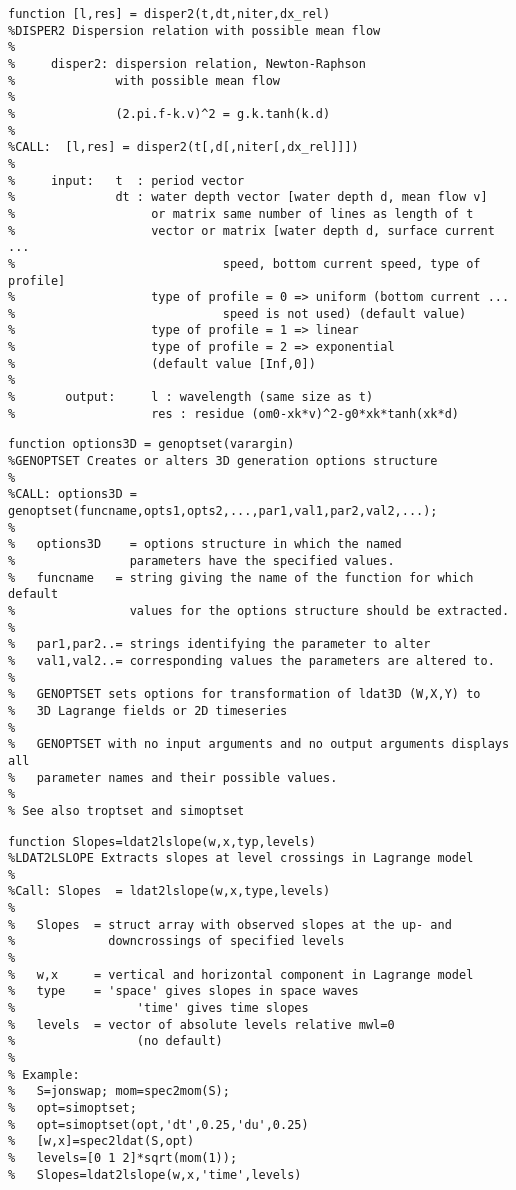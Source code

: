 {\begin{verbatim}
function [l,res] = disper2(t,dt,niter,dx_rel)
%DISPER2 Dispersion relation with possible mean flow
%
%     disper2: dispersion relation, Newton-Raphson
%              with possible mean flow
%
%              (2.pi.f-k.v)^2 = g.k.tanh(k.d)
%
%CALL:  [l,res] = disper2(t[,d[,niter[,dx_rel]]])
%
%     input:   t  : period vector
%              dt : water depth vector [water depth d, mean flow v] 
%                   or matrix same number of lines as length of t
%                   vector or matrix [water depth d, surface current ...
%                             speed, bottom current speed, type of profile]
%                   type of profile = 0 => uniform (bottom current ... 
%                             speed is not used) (default value)
%                   type of profile = 1 => linear
%                   type of profile = 2 => exponential
%                   (default value [Inf,0])
%
%       output:     l : wavelength (same size as t)
%                   res : residue (om0-xk*v)^2-g0*xk*tanh(xk*d)
\end{verbatim}
\clearpage

\begin{verbatim}
function options3D = genoptset(varargin)
%GENOPTSET Creates or alters 3D generation options structure
%
%CALL: options3D = genoptset(funcname,opts1,opts2,...,par1,val1,par2,val2,...);
%
%   options3D    = options structure in which the named 
%                parameters have the specified values.  
%   funcname   = string giving the name of the function for which default
%                values for the options structure should be extracted.
%
%   par1,par2..= strings identifying the parameter to alter
%   val1,val2..= corresponding values the parameters are altered to.
%   
%   GENOPTSET sets options for transformation of ldat3D (W,X,Y) to 
%   3D Lagrange fields or 2D timeseries
%
%   GENOPTSET with no input arguments and no output arguments displays all 
%   parameter names and their possible values.
%
% See also troptset and simoptset
\end{verbatim}
\clearpage

\begin{verbatim}
function Slopes=ldat2lslope(w,x,typ,levels)
%LDAT2LSLOPE Extracts slopes at level crossings in Lagrange model
%
%Call: Slopes  = ldat2lslope(w,x,type,levels)
%               
%   Slopes  = struct array with observed slopes at the up- and 
%             downcrossings of specified levels
%
%   w,x     = vertical and horizontal component in Lagrange model
%   type    = 'space' gives slopes in space waves
%                 'time' gives time slopes
%   levels  = vector of absolute levels relative mwl=0 
%                 (no default)
%
% Example:
%   S=jonswap; mom=spec2mom(S);
%   opt=simoptset;
%   opt=simoptset(opt,'dt',0.25,'du',0.25)
%   [w,x]=spec2ldat(S,opt)
%   levels=[0 1 2]*sqrt(mom(1));
%   Slopes=ldat2lslope(w,x,'time',levels)
\end{verbatim}
\clearpage

}
